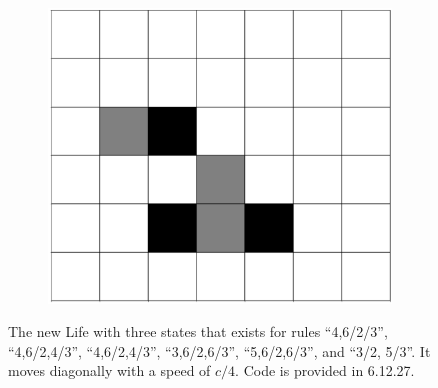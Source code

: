 \documentclass[12pt]{article}
\numberwithin{figure}{section} %
\begin{document}
\begin{figure}[H]
\begin{subfigure}{0.18\textwidth}
   	\end{subfigure}
        \begin{subfigure}{0.18\textwidth}
     	\centering
     	\includegraphics[width=\linewidth]{Section4/30.4}
     	\subcaption{}
   \end{subfigure}

   \caption{The new Life with three states that exists for rules “4,6/2/3”, “4,6/2,4/3”, “4,6/2,4/3”, “3,6/2,6/3”, “5,6/2,6/3”, and “3/2, 5/3”. It moves diagonally with a speed of $c/4$. Code is provided in 6.12.27.}
      \vspace{-1.5em}
\end{figure}
\end{document}

